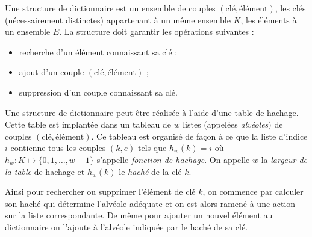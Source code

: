 Une structure de dictionnaire est un ensemble de couples
$(\text{clé},\text{élément})$, les clés (nécessairement distinctes)
appartenant à un même ensemble $K$, les éléments à un ensemble $E$. La
structure doit garantir les opérations suivantes :
\begin{itemize}
\item recherche d’un élément connaissant sa clé ;
\item ajout d’un couple $(\text{clé},\text{élément})$ ;
\item suppression d’un couple connaissant sa clé.
\end{itemize}
Une structure de dictionnaire peut-être réalisée à l’aide d’une table
de hachage. Cette table est implantée dans un tableau de $w$ listes
(appelées {\em alvéoles}) de couples $(\text{clé},\text{élément})$. Ce
tableau est organisé de façon à ce que la liste d’indice $i$ contienne
tous les couples $(k,e)$ tels que $h_w(k)=i$ où $h_w : K \mapsto \{0, 1, \ldots, w-1\}$ s’appelle {\em fonction de hachage}. 
On appelle $w$ la {\em largeur de la table} de hachage et $h_w(k)$ le {\em haché} de la clé $k$.

Ainsi pour rechercher ou supprimer l’élément de clé $k$, on commence
par calculer son haché qui détermine l’alvéole adéquate et on est
alors ramené à une action sur la liste correspondante. De même pour
ajouter un nouvel élément au dictionnaire on l’ajoute à l’alvéole
indiquée par le haché de sa clé.
